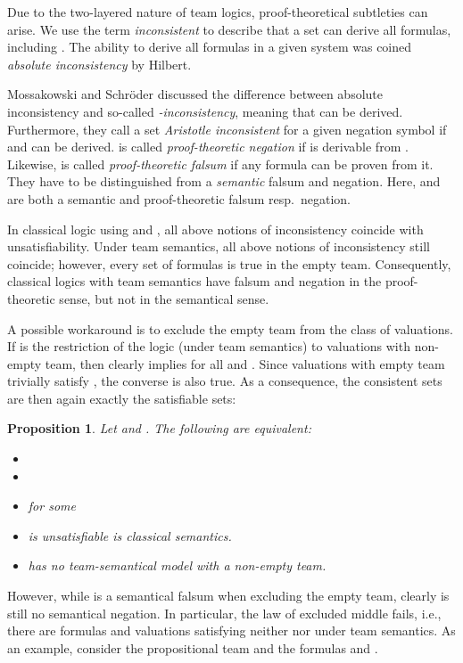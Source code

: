 \documentclass[a4paper,english,fleqn,11pt,final]{scrartcl}
\makeatletter
\newcommand{\ie}{i.e.\@\xspace}
\theoremstyle{plain}
\newtheorem{proposition}[theorem]{Proposition}
\theoremstyle{definition}
\makeatother
\begin{document}
Due to the two-layered nature of team logics, proof-theoretical subtleties can arise.
We use the term \emph{inconsistent} to describe that a set  can derive all  formulas, including .
The ability to derive all formulas in a given system was coined \emph{absolute inconsistency} by Hilbert.

Mossakowski and Schröder \cite{mossakowski2015inconsistency} discussed the difference between absolute inconsistency and so-called \emph{-inconsistency}, meaning that  can be derived.
Furthermore, they call a set \emph{Aristotle inconsistent} for a given negation symbol  if  and  can be derived.
 is called \emph{proof-theoretic negation} if  is derivable from .
Likewise,  is called \emph{proof-theoretic falsum} if any formula can be proven from it.
They have to be distinguished from a \emph{semantic} falsum and negation.
Here,  and  are both a semantic and proof-theoretic falsum resp.\ negation.

\smallskip

In classical logic using  and , all above notions of inconsistency coincide with unsatisfiability.
Under team semantics, all above notions of inconsistency still coincide; however, every set of formulas is true in the empty team.
Consequently, classical logics with team semantics have falsum and negation in the proof-theoretic sense, but not in the semantical sense.

A possible workaround is to exclude the empty team from the class of valuations.
If  is the restriction of the logic  (under team semantics) to valuations with non-empty team, then clearly  implies  for all  and .
Since valuations with empty team trivially satisfy , the converse is also true.
As a consequence, the consistent sets are then again exactly the satisfiable sets:

\begin{proposition}
Let  and .
The following are equivalent:
\begin{itemize}
\item 
\item 
\item  for some 
\item  is unsatisfiable is classical semantics.
\item  has no team-semantical model with a non-empty team.
\end{itemize}
\end{proposition}

However, while  is a semantical falsum when excluding the empty team, clearly  is still no semantical negation.
In particular, the law of excluded middle fails, \ie, there are formulas  and valuations satisfying neither  nor  under team semantics.
As an example, consider the propositional team  and the formulas  and .
\end{document}
